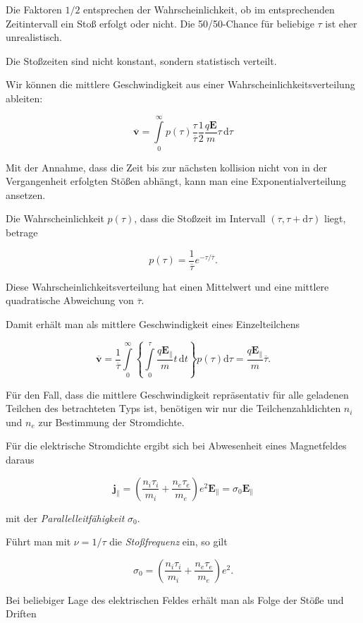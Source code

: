 \documentclass[
  a4paper,
  DIV=11]{scrreprt}
\begin{document}
Die Faktoren \(1/2\) entsprechen der Wahrscheinlichkeit, ob im
entsprechenden Zeitintervall ein Stoß erfolgt oder nicht. Die
50/50-Chance für beliebige \(\tau\) ist eher unrealistisch.

Die Stoßzeiten sind nicht konstant, sondern statistisch verteilt.

Wir können die mittlere Geschwindigkeit aus einer
Wahrscheinlichkeitsverteilung ableiten:

\[
\overline{\mathbf v} = \int\limits_0^\infty p(\tau) \frac{\tau}{\overline \tau} \frac{1}{2}\frac{q \mathbf E}{m} \tau \, \mathrm d\tau
\]

Mit der Annahme, dass die Zeit bis zur nächsten kollision nicht von in
der Vergangenheit erfolgten Stößen abhängt, kann man eine
Exponentialverteilung ansetzen.

Die Wahrscheinlichkeit \(p(\tau)\), dass die Stoßzeit im Intervall
\((\tau, \tau + \mathrm d\tau)\) liegt, betrage

\[
p(\tau) = \frac{1}{\overline\tau} e^{- \tau / \overline\tau}.
\]

Diese Wahrscheinlichkeitsverteilung hat einen Mittelwert und eine
mittlere quadratische Abweichung von \(\overline\tau\).

Damit erhält man als mittlere Geschwindigkeit eines Einzelteilchens

\[
\overline{\mathbf v} = \frac{1}{\overline\tau}\int\limits_0^\infty 
\left \{
\int\limits_0^\tau \frac{q \mathbf E_\|}{m} t \,\mathrm dt 
\right\}
p(\tau) \mathrm d \tau = \frac{q \mathbf E_\|}{m} \overline\tau.
\]

Für den Fall, dass die mittlere Geschwindigkeit repräsentativ für alle
geladenen Teilchen des betrachteten Typs ist, benötigen wir nur die
Teilchenzahldichten \(n_i\) und \(n_e\) zur Bestimmung der Stromdichte.

Für die elektrische Stromdichte ergibt sich bei Abwesenheit eines
Magnetfeldes daraus

\[
\mathbf j_\| = \left(
\frac{n_i \tau_i}{m_i} 
+
\frac{n_e \tau_e}{m_e}
\right) e^2 \mathbf E_\| = \sigma_0 \mathbf E_\|
\]

mit der \emph{Parallelleitfähigkeit} \(\sigma_0\).

Führt man mit \(\nu = 1 / \tau\) die \emph{Stoßfrequenz} ein, so gilt

\[
\sigma_0 = \left(
\frac{n_i \tau_i}{m_i} 
+
\frac{n_e \tau_e}{m_e}
\right) e^2.
\]

Bei beliebiger Lage des elektrischen Feldes erhält man als Folge der
Stöße und Driften
\end{document}
